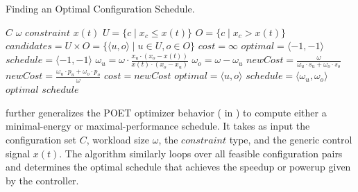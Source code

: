 \begin{algorithm}[t]
  \caption{Finding an Optimal Configuration Schedule.}
  \begin{algorithmic}
    \footnotesize
    \Require $C$ 
    \Require $\omega$ 
    \Require $constraint$ 
    \Require $x(t)$ 
    \State $U = \{c \mid x_c \le x(t) \}$
    \State $O = \{c \mid x_c > x(t)\}$
    \State $candidates = U \times O = \{\langle u,o \rangle \mid u \in U, o \in O\}$
    \State $cost = \infty$
    \State $optimal = \langle -1,-1 \rangle$
    \State $schedule = \langle -1,-1 \rangle$ \newline
     
    \State $\omega_u = \omega \cdot \frac{x_u \cdot (x_o - x(t))}{x(t) \cdot (x_o - x_u)}$ 
    \State $\omega_o = \omega - \omega_u$
     
    \State $newCost = \frac{\omega}{\omega_u \cdot s_u + \omega_o \cdot s_o}$ 
    \Else
    \State $newCost = \frac{\omega_u \cdot p_u + \omega_o \cdot p_o}{\omega}$ 
    \EndIf
     
    \State $cost = newCost$
    \State $optimal = \langle u,o \rangle$
    \State $schedule = \langle \omega_u,\omega_o \rangle$
    \EndIf
    \EndFor \newline \newline
    \Return $optimal$  \newline
    \Return $schedule$ 
  \end{algorithmic}
  \label{algo:bard-optimal}
\end{algorithm}

 further generalizes the POET optimizer behavior ( in ) to compute either a minimal-energy or maximal-performance schedule.
It takes as input the configuration set $C$, workload size $\omega$, the $constraint$ type, and the generic control signal $x(t)$.
The algorithm similarly loops over all feasible configuration pairs and determines the optimal schedule that achieves the speedup or powerup given by the controller.

